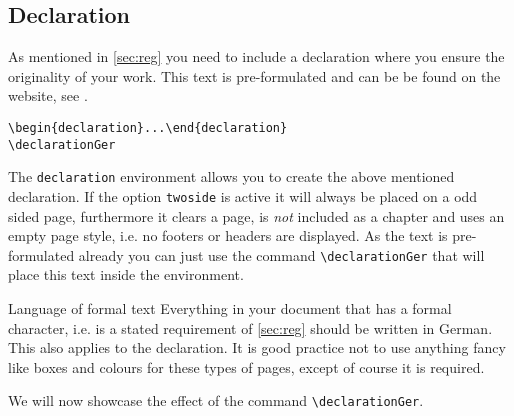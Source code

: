 \subsection{Declaration}\label{par:decla} As mentioned in \cref{sec:reg} you need to include 
a declaration where you ensure the originality of your work. This text is pre-formulated 
and can be be found on the website, see \cite{FAUreg}.
\begin{emphBox}
\lstinline|\begin{declaration}...\end{declaration}|\\
\lstinline|\declarationGer|
\end{emphBox}
The \lstinline|declaration| environment allows you to create the above mentioned 
declaration. If the option \lstinline|twoside| is active it will always be placed on a odd 
sided page, furthermore it clears a page, is \emph{not} included as a chapter and uses an 
empty page style, i.e. no footers or headers are displayed. 
As the text is pre-formulated already you can just use the command \lstinline|\declarationGer| 
that will place this text inside the environment. 
\begin{memo}{Language of formal text}
Everything in your document that has a formal character, i.e. is a stated requirement of 
\cref{sec:reg} should be written in German. This also applies to the declaration. 
It is good practice not to use anything fancy like boxes and colours for these types of 
pages, except of course it is required. 
\end{memo}
We will now showcase the effect of the command \lstinline|\declarationGer|.
\declarationGer
